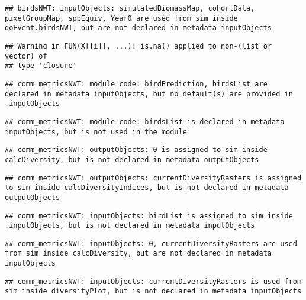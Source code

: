 \documentclass[]{article}
\begin{document}
\begin{verbatim}
## birdsNWT: inputObjects: simulatedBiomassMap, cohortData, pixelGroupMap, sppEquiv, Year0 are used from sim inside doEvent.birdsNWT, but are not declared in metadata inputObjects
\end{verbatim}

\begin{verbatim}
## Warning in FUN(X[[i]], ...): is.na() applied to non-(list or vector) of
## type 'closure'
\end{verbatim}

\begin{verbatim}
## comm_metricsNWT: module code: birdPrediction, birdsList are declared in metadata inputObjects, but no default(s) are provided in .inputObjects
\end{verbatim}

\begin{verbatim}
## comm_metricsNWT: module code: birdsList is declared in metadata inputObjects, but is not used in the module
\end{verbatim}

\begin{verbatim}
## comm_metricsNWT: outputObjects: 0 is assigned to sim inside calcDiversity, but is not declared in metadata outputObjects
\end{verbatim}

\begin{verbatim}
## comm_metricsNWT: outputObjects: currentDiversityRasters is assigned to sim inside calcDiversityIndices, but is not declared in metadata outputObjects
\end{verbatim}

\begin{verbatim}
## comm_metricsNWT: inputObjects: birdList is assigned to sim inside .inputObjects, but is not declared in metadata inputObjects
\end{verbatim}

\begin{verbatim}
## comm_metricsNWT: inputObjects: 0, currentDiversityRasters are used from sim inside calcDiversity, but are not declared in metadata inputObjects
\end{verbatim}

\begin{verbatim}
## comm_metricsNWT: inputObjects: currentDiversityRasters is used from sim inside diversityPlot, but is not declared in metadata inputObjects
\end{verbatim}
\end{document}

